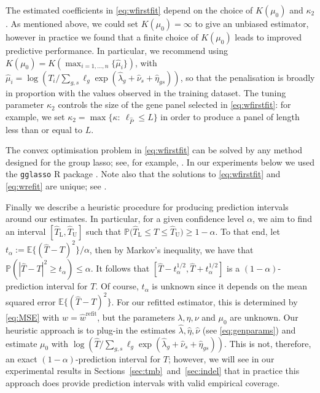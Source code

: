 \documentclass[12pt]{article}
\begin{document}
The estimated coefficients in \eqref{eq:wfirstfit} depend on the choice of $K(\mu_0)$ and $\kappa_2$.  As mentioned above, we could set $K(\mu_0) = \infty$ to give an unbiased estimator, however in practice we found that a finite choice of $K(\mu_0)$ leads to improved predictive performance. In particular, we recommend using $K(\mu_0) = K(\max_{i=1,\ldots, n}\{\hat{\mu}_i\})$, with $\hat{\mu}_i = \log(T_i/\sum_{g,s}\ell_g\exp(\hat{\lambda}_g + \hat{\nu}_s + \hat{\eta}_{gs}))$, so that the penalisation is broadly in proportion with the values observed in the training dataset. The tuning parameter $\kappa_2$ controls the size of the gene panel selected in \eqref{eq:wfirstfit}: for example, we set $\kappa_2 = \max \{\kappa: \ \ell_{\hat{P}} \leq L \}$ in order to produce a panel of length less than or equal to $L$.


The convex optimisation problem in \eqref{eq:wfirstfit} can be solved by any method designed for the group \acrshort{lasso}; see, for example, \citet{yang_fast_2015}. In our experiments below we used the \texttt{gglasso} R package \citep{yang_gglasso_2020}. Note also that the solutions to \eqref{eq:wfirstfit} and \eqref{eq:wrefit} are unique; see \citet[Theorem~1]{roth_group-lasso_2008}.

Finally we describe a heuristic procedure for producing prediction intervals around our estimates. In particular, for a given confidence level $\alpha$, we aim to find an interval $[\hat{T}_{\mathrm{L}}, \hat{T}_{\mathrm{U}}]$ such that $\mathbb{P}\bigl(\hat{T}_{\mathrm{L}} \leq T \leq \hat{T}_{\mathrm{U}}\bigr) \geq 1- \alpha.$  To that end, let $t_\alpha := \mathbb{E}\{(\hat{T} - T)^2\}/\alpha$, then by Markov's inequality, we have that  $ \mathbb{P}(|\hat{T} - T|^2 \geq t_\alpha) \leq \alpha$. It follows that $[\hat{T} - t_\alpha^{1/2} , \hat{T}+ t_\alpha^{1/2}]$ is a $(1-\alpha)$-prediction interval for $T$. Of course, $t_\alpha$ is unknown since it depends on the mean squared error $\mathbb{E}\{(\hat{T}-T)^2\}$. For our refitted estimator, this is determined by \eqref{eq:MSE} with $w = \hat{w}^{\text{refit}}$, but the parameters $\lambda, \eta, \nu$ and $\mu_0$ are unknown. Our heuristic approach is to plug-in the estimates $\hat{\lambda}, \hat{\eta}, \hat{\nu}$ (see \eqref{eq:genparams}) and estimate $\mu_0$ with $\log(\hat{T}/\sum_{g,s}\ell_g\exp(\hat{\lambda}_g + \hat{\nu}_s + \hat{\eta}_{gs}))$. This is not, therefore, an exact $(1-\alpha)$-prediction interval for $T$; however, we will see in our experimental results in Sections~\ref{sec:tmb}~and~\ref{sec:indel} that in practice this approach does provide prediction intervals with valid empirical coverage.  
\end{document}
